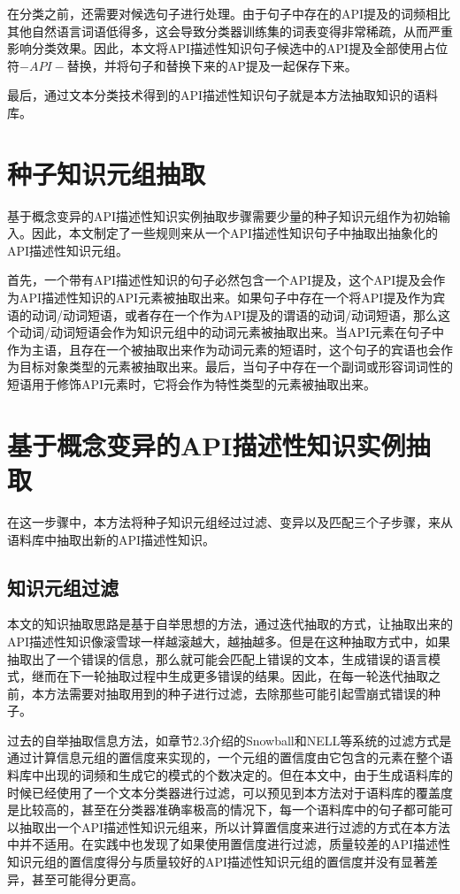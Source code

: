 在分类之前，还需要对候选句子进行处理。由于句子中存在的API提及的词频相比其他自然语言词语低得多，这会导致分类器训练集的词表变得非常稀疏，从而严重影响分类效果。因此，本文将API描述性知识句子候选中的API提及全部使用占位符$-API-$替换，并将句子和替换下来的AP提及一起保存下来。

最后，通过文本分类技术得到的API描述性知识句子就是本方法抽取知识的语料库。

\section{种子知识元组抽取}
基于概念变异的API描述性知识实例抽取步骤需要少量的种子知识元组作为初始输入。因此，本文制定了一些规则来从一个API描述性知识句子中抽取出抽象化的API描述性知识元组。

首先，一个带有API描述性知识的句子必然包含一个API提及，这个API提及会作为API描述性知识的API元素被抽取出来。如果句子中存在一个将API提及作为宾语的动词/动词短语，或者存在一个作为API提及的谓语的动词/动词短语，那么这个动词/动词短语会作为知识元组中的动词元素被抽取出来。当API元素在句子中作为主语，且存在一个被抽取出来作为动词元素的短语时，这个句子的宾语也会作为目标对象类型的元素被抽取出来。最后，当句子中存在一个副词或形容词词性的短语用于修饰API元素时，它将会作为特性类型的元素被抽取出来。

\section{基于概念变异的API描述性知识实例抽取}
在这一步骤中，本方法将种子知识元组经过过滤、变异以及匹配三个子步骤，来从语料库中抽取出新的API描述性知识。
\subsection{知识元组过滤}
本文的知识抽取思路是基于自举思想的方法，通过迭代抽取的方式，让抽取出来的API描述性知识像滚雪球一样越滚越大，越抽越多。但是在这种抽取方式中，如果抽取出了一个错误的信息，那么就可能会匹配上错误的文本，生成错误的语言模式，继而在下一轮抽取过程中生成更多错误的结果。因此，在每一轮迭代抽取之前，本方法需要对抽取用到的种子进行过滤，去除那些可能引起雪崩式错误的种子。

过去的自举抽取信息方法，如章节2.3介绍的Snowball和NELL等系统的过滤方式是通过计算信息元组的置信度来实现的，一个元组的置信度由它包含的元素在整个语料库中出现的词频和生成它的模式的个数决定的。但在本文中，由于生成语料库的时候已经使用了一个文本分类器进行过滤，可以预见到本方法对于语料库的覆盖度是比较高的，甚至在分类器准确率极高的情况下，每一个语料库中的句子都可能可以抽取出一个API描述性知识元组来，所以计算置信度来进行过滤的方式在本方法中并不适用。在实践中也发现了如果使用置信度进行过滤，质量较差的API描述性知识元组的置信度得分与质量较好的API描述性知识元组的置信度并没有显著差异，甚至可能得分更高。

